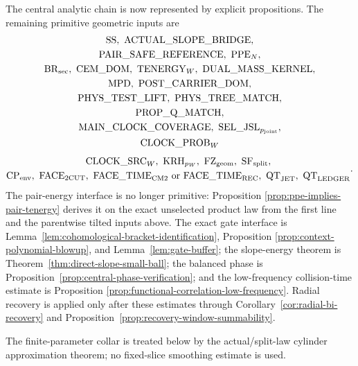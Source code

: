 \documentclass[11pt]{article}
\begin{document}
The central analytic chain is now represented by explicit propositions.
The remaining primitive geometric inputs are
\[
 \begin{gathered}
 \mathrm{SS},\ \mathrm{ACTUAL\_SLOPE\_BRIDGE},\\
 \mathrm{PAIR\_SAFE\_REFERENCE},\ \mathrm{PPE}_{N},\\
 \mathrm{BR}_{\rm sec},\ \mathrm{CEM\_DOM},\
 \mathrm{TENERGY}_{W},\ \mathrm{DUAL\_MASS\_KERNEL},\\
 \mathrm{MPD},\ \mathrm{POST\_CARRIER\_DOM},\\
 \mathrm{PHYS\_TEST\_LIFT},\ \mathrm{PHYS\_TREE\_MATCH},\\
 \mathrm{PROP\_Q\_MATCH},\\
 \mathrm{MAIN\_CLOCK\_COVERAGE},\
 \mathrm{SEL\_JSL}_{p_{\rm joint}},\\
 \mathrm{CLOCK\_PROB}_{W}
 \end{gathered}
\]
\[
 \begin{gathered}
 \mathrm{CLOCK\_SRC}_{W},\ \mathrm{KRH}_{p_W},\
 \mathrm{FZ}_{\rm geom},\ \mathrm{SF}_{\rm split},\\
 \mathrm{CP}_{\rm env},\ \mathrm{FACE}_{\rm 2CUT},\
 \mathrm{FACE\_TIME}_{\rm CM2}\text{ or }\mathrm{FACE\_TIME}_{\rm REC},\
 \mathrm{QT}_{\rm JET},\ \mathrm{QT}_{\rm LEDGER}
 \end{gathered}.
\]
The pair-energy interface is no longer primitive: Proposition
\ref{prop:ppe-implies-pair-tenergy} derives it on the exact unselected
product law from the first line and the parentwise tilted inputs above.
The exact gate interface is
Lemma~\ref{lem:cohomological-bracket-identification}, Proposition
\ref{prop:context-polynomial-blowup}, and Lemma~\ref{lem:gate-buffer}; the
slope-energy theorem is Theorem~\ref{thm:direct-slope-small-ball}; the
balanced phase is Proposition~\ref{prop:central-phase-verification}; and the
low-frequency collision-time estimate is Proposition
\ref{prop:functional-correlation-low-frequency}.  Radial recovery is applied
only after these estimates through Corollary~\ref{cor:radial-bi-recovery} and
Proposition~\ref{prop:recovery-window-summability}.

The finite-parameter collar is treated below by the actual/split-law cylinder
approximation theorem; no fixed-slice smoothing estimate is used.
\end{document}
